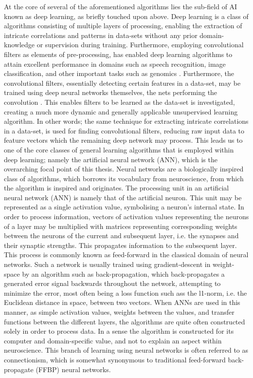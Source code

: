 At the core of several of the aforementioned algorithms lies the sub-field of AI known as deep learning, as briefly touched upon above. Deep learning is a class of algorithms consisting of multiple layers of processing, enabling the extraction of intricate correlations and patterns in data-sets without any prior domain-knowledge or supervision during training. Furthermore, employing convolutional filters as elements of pre-processing, has enabled deep learning algorithms to attain excellent performance in domains such as speech recognition, image classification, and other important tasks such as genomics \citep{LeCun2015}. Furthermore, the convolutional filters, essentially detecting certain features in a data-set, may be trained using deep neural networks themselves, the nets performing the convolution \citep{LeCun2015}. This enables filters to be learned as the data-set is investigated, creating a much more dynamic and generally applicable unsupervised learning algorithm. In other words; the same technique for extracting intricate correlations in a data-set, is used for finding convolutional filters, reducing raw input data to feature vectors which the remaining deep network may process. This leads us to one of the core classes of general learning algorithms that is employed within deep learning; namely the artificial neural network (ANN), which is the overarching focal point of this thesis.
Neural networks are a biologically inspired class of algorithms, which borrows its vocabulary from neuroscience, from which the algorithm is inspired and originates. The processing unit in an artificial neural network (ANN) is namely that of the artificial neuron. This unit may be represented as a single activation value, symbolising a neuron's internal state. In order to process information, vectors of activation values representing the neurons of a layer may be multiplied with matrices representing corresponding weights between the neurons of the current and subsequent layer, i.e. the synapses and their synaptic strengths. This propagates information to the subsequent layer. This process is commonly known as feed-forward in the classical domain of neural networks. Such a network is usually trained using gradient-descent in weight-space by an algorithm such as back-propagation, which back-propagates a generated error signal backwards throughout the network, attempting to minimize the error, most often being a loss function such ass the l1-norm, i.e. the Euclidean distance in space, between two vectors. 
When ANNs are used in this manner, as simple activation values, weights between the values, and transfer functions between the different layers, the algorithms are quite often constructed solely in order to process data. In a sense the algorithm is constructed for its computer and domain-specific value, and not to explain an aspect within neuroscience. This branch of learning using neural networks is often referred to as connectionism, which is somewhat synonymous to traditional feed-forward back-propagate (FFBP) neural networks.
